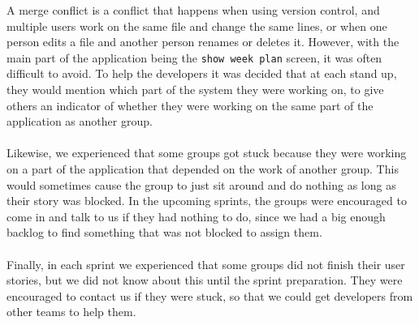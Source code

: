A merge conflict is a conflict that happens when using version control, and multiple users work on the same file and change the same lines, or when one person edits a file and another person renames or deletes it.
However, with the main part of the application being the \texttt{show week plan} screen, it was often difficult to avoid. 
To help the developers it was decided that at each stand up, they would mention which part of the system they were working on, to give others an indicator of whether they were working on the same part of the application as another group.
\\\\
Likewise, we experienced that some groups got stuck because they were working on a part of the application that depended on the work of another group.
This would sometimes cause the group to just sit around and do nothing as long as their story was blocked.
In the upcoming sprints, the groups were encouraged to come in and talk to us if they had nothing to do, since we had a big enough backlog to find something that was not blocked to assign them.
\\\\
Finally, in each sprint we experienced that some groups did not finish their user stories, but we did not know about this until the sprint preparation.
They were encouraged to contact us if they were stuck, so that we could get developers from other teams to help them.
